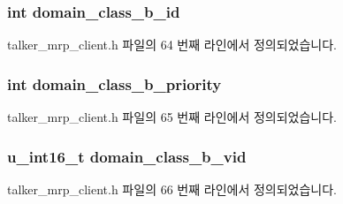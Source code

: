 \subsubsection[{\texorpdfstring{domain\+\_\+class\+\_\+b\+\_\+id}{domain_class_b_id}}]{\setlength{\rightskip}{0pt plus 5cm}int domain\+\_\+class\+\_\+b\+\_\+id}\hypertarget{structmrp__talker__ctx_a058aabd498c78e32b6610fd06f90fc43}{}\label{structmrp__talker__ctx_a058aabd498c78e32b6610fd06f90fc43}


talker\+\_\+mrp\+\_\+client.\+h 파일의 64 번째 라인에서 정의되었습니다.

\subsubsection[{\texorpdfstring{domain\+\_\+class\+\_\+b\+\_\+priority}{domain_class_b_priority}}]{\setlength{\rightskip}{0pt plus 5cm}int domain\+\_\+class\+\_\+b\+\_\+priority}\hypertarget{structmrp__talker__ctx_a90efafdfc3b16f51cc0f67aa65796a3c}{}\label{structmrp__talker__ctx_a90efafdfc3b16f51cc0f67aa65796a3c}


talker\+\_\+mrp\+\_\+client.\+h 파일의 65 번째 라인에서 정의되었습니다.

\subsubsection[{\texorpdfstring{domain\+\_\+class\+\_\+b\+\_\+vid}{domain_class_b_vid}}]{\setlength{\rightskip}{0pt plus 5cm}u\+\_\+int16\+\_\+t domain\+\_\+class\+\_\+b\+\_\+vid}\hypertarget{structmrp__talker__ctx_a153312a7212b932f60b49a67309f2053}{}\label{structmrp__talker__ctx_a153312a7212b932f60b49a67309f2053}


talker\+\_\+mrp\+\_\+client.\+h 파일의 66 번째 라인에서 정의되었습니다.

